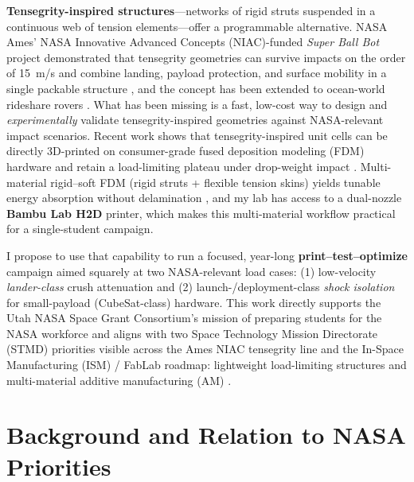 \documentclass[11pt]{article}
\begin{document}
\textbf{Tensegrity-inspired structures}---networks of rigid struts suspended
in a continuous web of tension elements---offer a programmable alternative.
NASA Ames' NASA Innovative Advanced Concepts (NIAC)-funded \emph{Super Ball Bot} project demonstrated that
tensegrity geometries can survive impacts on the order of 15~m/s and combine
landing, payload protection, and surface mobility in a single packable
structure \citep{caluwaerts2014superball,agogino2018superball,sabelhaus2015system,vespignani2018design},
and the concept has been extended to ocean-world rideshare rovers
\citep{deitrich2022titan}.  What has been missing is a fast, low-cost way to
design and \emph{experimentally} validate tensegrity-inspired geometries
against NASA-relevant impact scenarios.  Recent work shows that
tensegrity-inspired unit cells can be directly 3D-printed on consumer-grade
fused deposition modeling (FDM) hardware and retain a load-limiting plateau under drop-weight impact
\citep{pajunen2019design}.  Multi-material rigid--soft FDM (rigid struts +
flexible tension skins) yields tunable energy absorption without delamination
\citep{ye2023multimaterial,khatri2024energy}, and my lab has access to a
dual-nozzle \textbf{Bambu Lab H2D} printer, which makes this multi-material
workflow practical for a single-student campaign.

I propose to use that capability to run a focused, year-long
\textbf{print--test--optimize} campaign aimed squarely at two NASA-relevant
load cases: (1) low-velocity \emph{lander-class} crush attenuation and
(2) launch-/deployment-class \emph{shock isolation} for small-payload
(CubeSat-class) hardware.  This work directly supports the Utah NASA Space
Grant Consortium's mission of preparing students for the NASA workforce and
aligns with two Space Technology Mission Directorate (STMD) priorities visible across the Ames NIAC tensegrity line
and the In-Space Manufacturing (ISM) / FabLab roadmap: lightweight
load-limiting structures and multi-material additive manufacturing (AM)
\citep{nasa2022strategic,prater2019summary,agogino2018superball}.

\section{Background and Relation to NASA Priorities}
\end{document}
